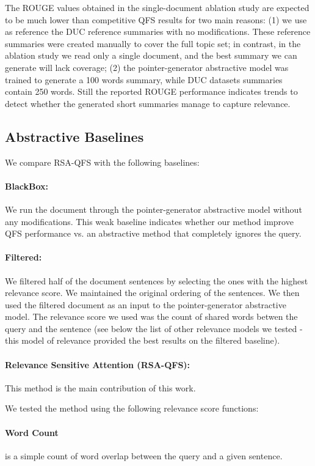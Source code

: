 \documentclass[11pt,a4paper]{article}
\begin{document}
The ROUGE values obtained in the single-document ablation study are expected to be much lower than competitive QFS results for two main reasons: (1) we use as reference the DUC reference summaries with no modifications. These reference summaries were created manually to cover the full topic set; in contrast, in the ablation study we read only a single document, and the best summary we can generate will lack coverage; (2) the pointer-generator abstractive model was trained to generate a 100 words summary, while DUC datasets summaries contain 250 words.  Still the reported ROUGE performance indicates trends to detect whether the generated short summaries manage to capture relevance.

\subsection{Abstractive Baselines}

We compare RSA-QFS with the following baselines:

\paragraph{BlackBox:} We run the document through the pointer-generator abstractive model without any modifications. This weak baseline indicates whether our method improve QFS performance vs. an abstractive method that completely ignores the query.   

\paragraph{Filtered:} We filtered half of the document sentences by selecting the ones with the highest relevance score. We maintained the original ordering of the sentences. We then used the filtered document as an input to the pointer-generator abstractive model. The relevance score we used was the count of shared words betwen the query and the sentence (see below the list of other relevance models we tested - this model of relevance provided the best results on the filtered baseline).

\paragraph{Relevance Sensitive Attention (RSA-QFS):} This method is the main contribution of this work. 

We tested the method using the following relevance score functions:
\paragraph{Word Count} is a simple count of word overlap between the query and a given sentence.
\end{document}
